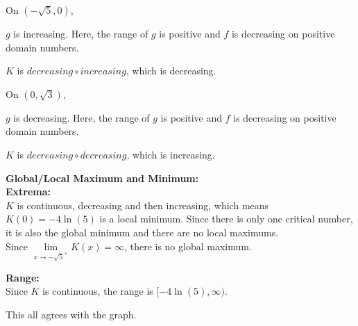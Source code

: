 \documentclass{ximera}
\begin{document}
On $(-\sqrt{5}, 0)$, 


$g$ is increasing. Here, the range of $g$ is positive and $f$ is decreasing on positive domain numbers.

\begin{center}
$K$ is $decreasing \circ increasing$, which is decreasing. \\
\end{center}




On $(0, \sqrt{3})$, 


$g$ is decreasing. Here, the range of $g$ is positive and $f$ is decreasing on positive domain numbers.


\begin{center}
$K$ is $decreasing \circ decreasing$, which is increasing. \\
\end{center}







\textbf{\textcolor{blue!55!black}{Global/Local Maximum and Minimum:}} \\
\textbf{Extrema:} \\

$K$ is continuous, decreasing and then increasing, which means $K(0) = -4 \ln(5)$ is a local minimum. Since there is only one critical number, it is also the global minimum and there are no local maximums.\\



Since $\lim\limits_{x \to -\sqrt{5}^+} K(x) = \infty$,  there is no global maximum.












\textbf{\textcolor{blue!55!black}{Range:}} \\

Since $K$ is continuous, the range is $[-4 \ln(5), \infty)$.




This all agrees with the graph. \\
\end{document}
